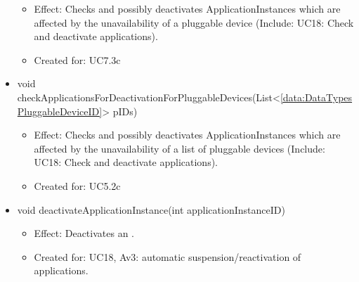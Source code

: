 \begin{description}
\begin{itemize}[noitemsep,nolistsep,leftmargin=-.25cm]
        \begin{itemize}[noitemsep,nolistsep]
           \item Effect: Checks and possibly deactivates ApplicationInstances which are affected by the unavailability of a pluggable device (Include: UC18: Check and deactivate applications).
\item Created for: UC7.3c
        \end{itemize}
      \item \textsf{void checkApplicationsForDeactivationForPluggableDevices(List\textless{}\ref{data:DataTypesPluggableDeviceID}\textgreater{} pIDs)}
        \begin{itemize}[noitemsep,nolistsep]
           \item Effect: Checks and possibly deactivates ApplicationInstances which are affected by the unavailability of a list of pluggable devices (Include: UC18: Check and deactivate applications).
\item Created for: UC5.2c
        \end{itemize}
      \item \textsf{void deactivateApplicationInstance(int applicationInstanceID)}
        \begin{itemize}[noitemsep,nolistsep]
           \item Effect: Deactivates an .
\item Created for: UC18, Av3: automatic suspension/reactivation of applications.
        \end{itemize}
    \end{itemize}
    \end{description}

